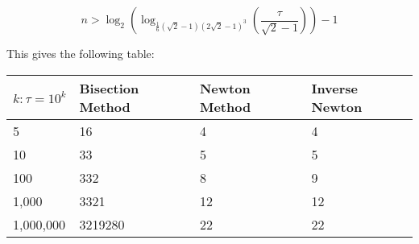 \[n > \log_2\left(\log_{\tfrac{1}{6}(\sqrt{2} - 1)(2\sqrt{2} - 1)^3}\left(\frac{\tau}{\sqrt{2} - 1}\right)\right) - 1\]

This gives the following table:

\begin{center}
\begin{tabular}{|p{3cm}|p{3cm}|p{3cm}|p{3cm}|}
\hline
\(k : \tau = 10^k\) & Bisection Method & Newton Method & Inverse Newton\\\hline
5 & 		16 &		4 &		4\\\hline
10 & 		33 &		5 &		5\\\hline
100 & 		332 &		8 &		9\\\hline
1,000 & 	3321 &		12 &	12\\\hline
1,000,000 & 3219280 &	22 &	22\\\hline
\end{tabular}
\end{center}

